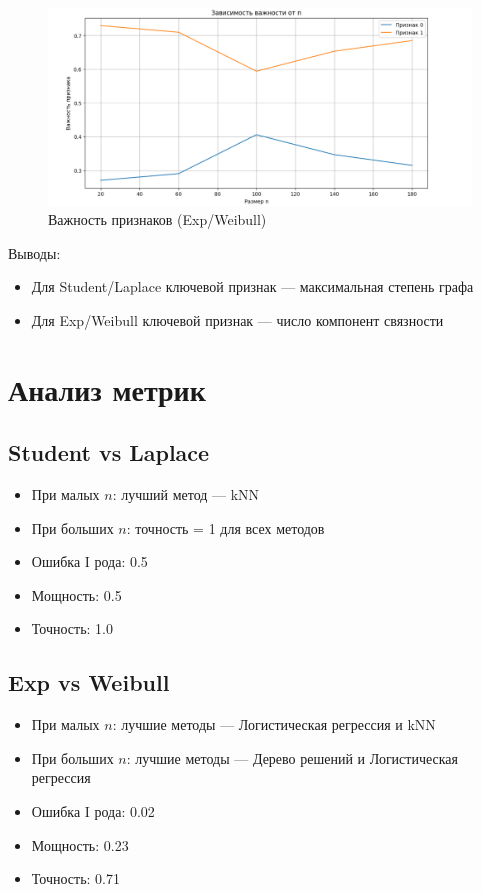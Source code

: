 \documentclass{HSEtitle}
\begin{document}
\begin{figure}[H]
    \centering
    \includegraphics[width=0.7\linewidth]{importance2.png}
    \caption{Важность признаков (Exp/Weibull)}
    \label{fig:importance2}
\end{figure}

Выводы:
\begin{itemize}
    \item Для Student/Laplace ключевой признак — максимальная степень графа
    \item Для Exp/Weibull ключевой признак — число компонент связности
\end{itemize}

\section{Анализ метрик}

\subsection{Student vs Laplace}
\begin{itemize}
    \item При малых $n$: лучший метод — kNN
    \item При больших $n$: точность = 1 для всех методов
    \item Ошибка I рода: 0.5
    \item Мощность: 0.5
    \item Точность: 1.0
\end{itemize}

\subsection{Exp vs Weibull}
\begin{itemize}
    \item При малых $n$: лучшие методы — Логистическая регрессия и kNN
    \item При больших $n$: лучшие методы — Дерево решений и Логистическая регрессия
    \item Ошибка I рода: 0.02
    \item Мощность: 0.23
    \item Точность: 0.71
\end{itemize}
\end{document}
